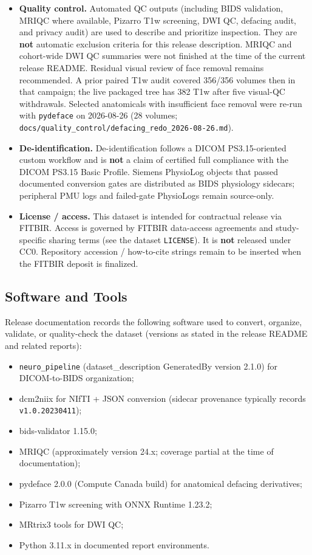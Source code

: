 \begin{itemize}
    \item \textbf{Quality control.}
    Automated QC outputs (including BIDS validation, MRIQC where available, Pizarro T1w screening, DWI QC, defacing audit, and privacy audit) are used to describe and prioritize inspection.
    They are \textbf{not} automatic exclusion criteria for this release description.
    MRIQC and cohort-wide DWI QC summaries were not finished at the time of the current release README.
    Residual visual review of face removal remains recommended. A prior paired T1w audit covered 356/356 volumes then in that campaign; the live packaged tree has 382 T1w after five visual-QC withdrawals. Selected anatomicals with insufficient face removal were re-run with \texttt{pydeface} on 2026-08-26 (28 volumes; \texttt{docs/quality\_control/defacing\_redo\_2026-08-26.md}).

    \item \textbf{De-identification.}
    De-identification follows a DICOM PS3.15-oriented custom workflow and is \textbf{not} a claim of certified full compliance with the DICOM PS3.15 Basic Profile.
    Siemens PhysioLog objects that passed documented conversion gates are distributed as BIDS physiology sidecars; peripheral PMU logs and failed-gate PhysioLogs remain source-only.

    \item \textbf{License / access.}
    This dataset is intended for contractual release via FITBIR.
    Access is governed by FITBIR data-access agreements and study-specific sharing terms (see the dataset \texttt{LICENSE}).
    It is \textbf{not} released under CC0.
    Repository accession / how-to-cite strings remain to be inserted when the FITBIR deposit is finalized.
\end{itemize}

\subsection{Software and Tools}

Release documentation records the following software used to convert, organize, validate, or quality-check the dataset (versions as stated in the release README and related reports):

\begin{itemize}
    \item \texttt{neuro\_pipeline} (dataset\_description GeneratedBy version 2.1.0) for DICOM-to-BIDS organization;
    \item dcm2niix for NIfTI + JSON conversion (sidecar provenance typically records \texttt{v1.0.20230411});
    \item bids-validator 1.15.0;
    \item MRIQC (approximately version 24.x; coverage partial at the time of documentation);
    \item pydeface 2.0.0 (Compute Canada build) for anatomical defacing derivatives;
    \item Pizarro T1w screening with ONNX Runtime 1.23.2;
    \item MRtrix3 tools for DWI QC;
    \item Python 3.11.x in documented report environments.
\end{itemize}

